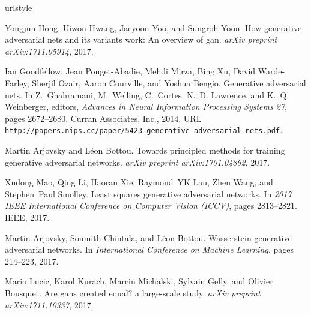 \documentclass{article}
\begin{document}

\begin{thebibliography}{25}
	\providecommand{\natexlab}[1]{#1}
	\providecommand{\url}[1]{\texttt{#1}}
	\expandafter\ifx\csname urlstyle\endcsname\relax
	\providecommand{\doi}[1]{doi: #1}\else
	\providecommand{\doi}{doi: \begingroup \urlstyle{rm}\Url}\fi
	
	Yongjun Hong, Uiwon Hwang, Jaeyoon Yoo, and Sungroh Yoon.
	\newblock How generative adversarial nets and its variants work: An overview of
	gan.
	\newblock \emph{arXiv preprint arXiv:1711.05914}, 2017.
	
	Ian Goodfellow, Jean Pouget-Abadie, Mehdi Mirza, Bing Xu, David Warde-Farley,
	Sherjil Ozair, Aaron Courville, and Yoshua Bengio.
	\newblock Generative adversarial nets.
	\newblock In Z.~Ghahramani, M.~Welling, C.~Cortes, N.~D. Lawrence, and K.~Q.
	Weinberger, editors, \emph{Advances in Neural Information Processing Systems
		27}, pages 2672--2680. Curran Associates, Inc., 2014.
	\newblock URL
	\url{http://papers.nips.cc/paper/5423-generative-adversarial-nets.pdf}.
	
	Martin Arjovsky and L{\'e}on Bottou.
	\newblock Towards principled methods for training generative adversarial
	networks.
	\newblock \emph{arXiv preprint arXiv:1701.04862}, 2017.
	
	Xudong Mao, Qing Li, Haoran Xie, Raymond~YK Lau, Zhen Wang, and Stephen~Paul
	Smolley.
	\newblock Least squares generative adversarial networks.
	\newblock In \emph{2017 IEEE International Conference on Computer Vision
		(ICCV)}, pages 2813--2821. IEEE, 2017.
	
	Martin Arjovsky, Soumith Chintala, and L{\'e}on Bottou.
	\newblock Wasserstein generative adversarial networks.
	\newblock In \emph{International Conference on Machine Learning}, pages
	214--223, 2017.
	
	Mario Lucic, Karol Kurach, Marcin Michalski, Sylvain Gelly, and Olivier
	Bousquet.
	\newblock Are gans created equal? a large-scale study.
	\newblock \emph{arXiv preprint arXiv:1711.10337}, 2017.
	

\end{thebibliography}
\end{document}

